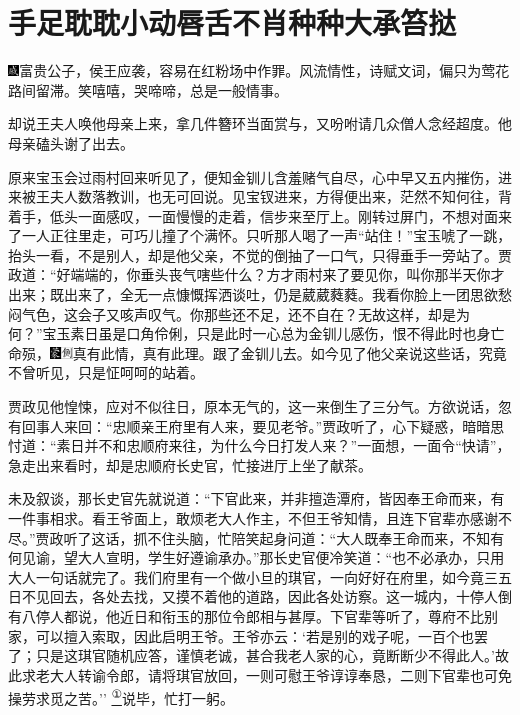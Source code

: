 

\chapter{手足耽耽小动唇舌\hspace{.5em}不肖种种大承笞挞}

{\includegraphics[width=3mm]{../Images/00005}富贵公子，侯王应袭，容易在红粉场中作罪。风流情性，诗赋文词，偏只为莺花路间留滞。笑嘻嘻，哭啼啼，总是一般情事。}

却说王夫人唤他母亲上来，拿几件簪环当面赏与，又吩咐请几众僧人念经超度。他母亲磕头谢了出去。

原来宝玉会过雨村回来听见了，便知金钏儿含羞赌气自尽，心中早又五内摧伤，进来被王夫人数落教训，也无可回说。见宝钗进来，方得便出来，茫然不知何往，背着手，低头一面感叹，一面慢慢的走着，信步来至厅上。刚转过屏门，不想对面来了一人正往里走，可巧儿撞了个满怀。只听那人喝了一声``站住！''宝玉唬了一跳，抬头一看，不是别人，却是他父亲，不觉的倒抽了一口气，只得垂手一旁站了。贾政道：``好端端的，你垂头丧气嗐些什么？方才雨村来了要见你，叫你那半天你才出来；既出来了，全无一点慷慨挥洒谈吐，仍是葳葳蕤蕤。我看你脸上一团思欲愁闷气色，这会子又咳声叹气。你那些还不足，还不自在？无故这样，却是为何？''宝玉素日虽是口角伶俐，只是此时一心总为金钏儿感伤，恨不得此时也身亡命殒，{\includegraphics[width=3mm]{../Images/00006}\includegraphics[width=3mm]{../Images/00011}\footnotesize \kaishu 真有此情，真有此理。}跟了金钏儿去。如今见了他父亲说这些话，究竟不曾听见，只是怔呵呵的站着。

贾政见他惶悚，应对不似往日，原本无气的，这一来倒生了三分气。方欲说话，忽有回事人来回：``忠顺亲王府里有人来，要见老爷。''贾政听了，心下疑惑，暗暗思忖道：``素日并不和忠顺府来往，为什么今日打发人来？''一面想，一面令``快请''，急走出来看时，却是忠顺府长史官，忙接进厅上坐了献茶。

未及叙谈，那长史官先就说道：``下官此来，并非擅造潭府，皆因奉王命而来，有一件事相求。看王爷面上，敢烦老大人作主，不但王爷知情，且连下官辈亦感谢不尽。''贾政听了这话，抓不住头脑，忙陪笑起身问道：``大人既奉王命而来，不知有何见谕，望大人宣明，学生好遵谕承办。''那长史官便冷笑道：``也不必承办，只用大人一句话就完了。我们府里有一个做小旦的琪官，一向好好在府里，如今竟三五日不见回去，各处去找，又摸不着他的道路，因此各处访察。这一城内，十停人倒有八停人都说，他近日和衔玉的那位令郎相与甚厚。下官辈等听了，尊府不比别家，可以擅入索取，因此启明王爷。王爷亦云：`若是别的戏子呢，一百个也罢了；只是这琪官随机应答，谨慎老诚，甚合我老人家的心，竟断断少不得此人。'故此求老大人转谕令郎，请将琪官放回，一则可慰王爷谆谆奉恳，二则下官辈也可免操劳求觅之苦。''{
}\href{../Text/part0037_split_000.html\#lnkback_1_a}{\textsuperscript{①}}说毕，忙打一躬。

